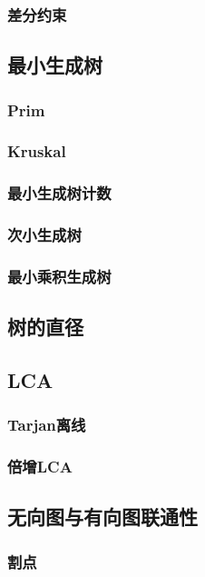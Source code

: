 \documentclass[twocolumn,a4]{article}
\newcommand{\addcpp}[1]{}
\begin{document}
		\subsubsection{差分约束}
			\addcpp{graph/difference_constrain}
	\subsection{最小生成树}
		\subsubsection{Prim}
			\addcpp{graph/prim}
		\subsubsection{Kruskal}
			\addcpp{graph/kruskal}
		\subsubsection{最小生成树计数}
		\subsubsection{次小生成树}
			\addcpp{graph/second_MST}
		\subsubsection{最小乘积生成树}
			\addcpp{graph/multiply_MST}
	\subsection{树的直径}
	\subsection{LCA}
		\subsubsection{Tarjan离线}
			\addcpp{graph/tarjan_lca}
		\subsubsection{倍增LCA}
			\addcpp{graph/da_lca}
	\subsection{无向图与有向图联通性}
		\subsubsection{割点}
			\addcpp{graph/cut_point}
\end{document}
